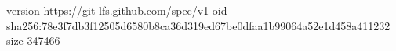 version https://git-lfs.github.com/spec/v1
oid sha256:78e3f7db3f12505d6580b8ca36d319ed67be0dfaa1b99064a52e1d458a411232
size 347466
